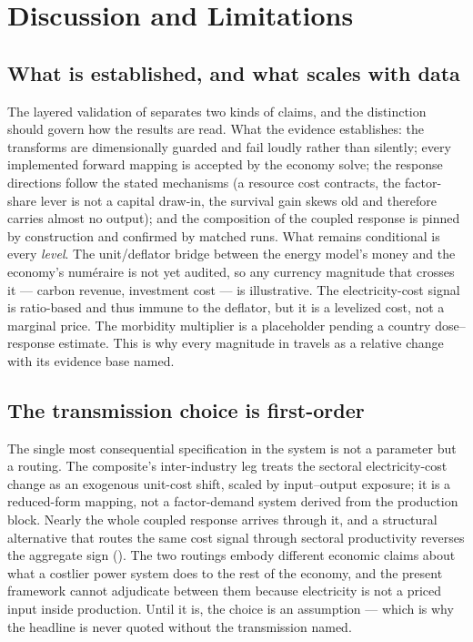 \section{Discussion and Limitations}
\label{sec:discussion}

\subsection{What is established, and what scales with data}
The layered validation of  separates two kinds of claims, and the
distinction should govern how the results are read. What the evidence establishes: the
transforms are dimensionally guarded and fail loudly rather than silently; every
implemented forward mapping is accepted by the economy solve; the response directions
follow the stated mechanisms (a resource cost contracts, the factor-share lever is not
a capital draw-in, the survival gain skews old and therefore carries almost no output);
and the composition of the coupled response is pinned by construction and confirmed by
matched runs. What remains conditional is every \emph{level}. The unit/deflator bridge
between the energy model's money and the economy's num\'eraire is not yet audited, so
any currency magnitude that crosses it --- carbon revenue, investment cost --- is
illustrative. The electricity-cost signal is ratio-based and thus immune to the
deflator, but it is a levelized cost, not a marginal price. The morbidity multiplier is
a placeholder pending a country dose--response estimate. This is why every magnitude in
 travels as a relative change with its evidence base named.

\subsection{The transmission choice is first-order}
The single most consequential specification in the system is not a parameter but a
routing. The composite's inter-industry leg treats the sectoral electricity-cost change
as an exogenous unit-cost shift, scaled by input--output exposure; it is a reduced-form
mapping, not a factor-demand system derived from the production block. Nearly the whole
coupled response arrives through it, and a structural alternative that routes the same
cost signal through sectoral productivity reverses the aggregate sign
(). The two routings embody different economic claims about
what a costlier power system does to the rest of the economy, and the present framework
cannot adjudicate between them because electricity is not a priced input inside
production. Until it is, the choice is an assumption --- which is why the headline is
never quoted without the transmission named.

